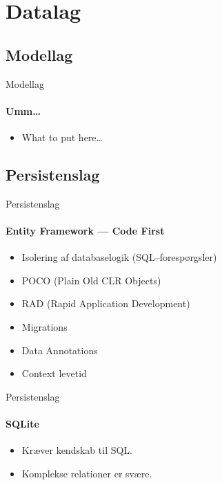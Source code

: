 \section{Datalag}


\subsection{Modellag}

\begin{frame}{Modellag}
  \framesubtitle{Umm\ldots}
  \begin{itemize}
    \item<1-> What to put here\ldots
  \end{itemize}
\end{frame}


\subsection{Persistenslag}

\begin{frame}{Persistenslag}
  \framesubtitle{Entity Framework --- Code First}
  \begin{itemize}
    \item<1-> Isolering af databaselogik (SQL--forespørgsler)
    \item<1-> POCO (Plain Old CLR Objects)
    \item<1-> RAD (Rapid Application Development)
    \item<2-> Migrations
    \item<2-> Data Annotations
    \item<3-> Context levetid
  \end{itemize}
\end{frame}

\begin{frame}{Persistenslag}
  \framesubtitle{SQLite}
  \begin{itemize}
    \item<1-> Kræver kendskab til SQL.
    \item<1-> Komplekse relationer er svære.
  \end{itemize}
\end{frame}